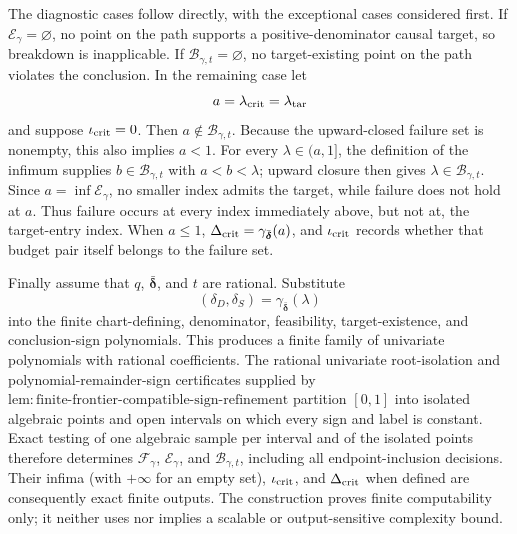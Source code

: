 The diagnostic cases follow directly, with the exceptional cases considered first.  If \(\mathcal E_\gamma=\varnothing\), no point on the path supports a positive-denominator causal target, so breakdown is inapplicable.  If \(\mathcal B_{\gamma,t}=\varnothing\), no target-existing point on the path violates the conclusion.  In the remaining case let
\[
 a=\lambda_{\rm crit}=\lambda_{\rm tar}
\]
and suppose \(\iota_{\rm crit}=0\).  Then \(a\notin\mathcal B_{\gamma,t}\).  Because the upward-closed failure set is nonempty, this also implies \(a<1\).  For every \(\lambda\in(a,1]\), the definition of the infimum supplies \(b\in\mathcal B_{\gamma,t}\) with \(a<b<\lambda\); upward closure then gives \(\lambda\in\mathcal B_{\gamma,t}\).  Since \(a=\inf\mathcal E_\gamma\), no smaller index admits the target, while failure does not hold at \(a\).  Thus failure occurs at every index immediately above, but not at, the target-entry index.  When \(a\leq1\), \(\Delta_{\rm crit}=\gamma_{\bar{\boldsymbol\delta}}(a)\), and \(\iota_{\rm crit}\) records whether that budget pair itself belongs to the failure set.

Finally assume that \(q\), \(\bar{\boldsymbol\delta}\), and \(t\) are rational.  Substitute
\[
 (\delta_D,\delta_S)
 =\gamma_{\bar{\boldsymbol\delta}}(\lambda)
\]
into the finite chart-defining, denominator, feasibility, target-existence, and conclusion-sign polynomials.  This produces a finite family of univariate polynomials with rational coefficients.  The rational univariate root-isolation and polynomial-remainder-sign certificates supplied by \(\mathrm{lem:finite\text{-}frontier\text{-}compatible\text{-}sign\text{-}refinement}\) partition \([0,1]\) into isolated algebraic points and open intervals on which every sign and label is constant.  Exact testing of one algebraic sample per interval and of the isolated points therefore determines \(\mathcal F_\gamma\), \(\mathcal E_\gamma\), and \(\mathcal B_{\gamma,t}\), including all endpoint-inclusion decisions.  Their infima (with \(+\infty\) for an empty set), \(\iota_{\rm crit}\), and \(\Delta_{\rm crit}\) when defined are consequently exact finite outputs.  The construction proves finite computability only; it neither uses nor implies a scalable or output-sensitive complexity bound.
